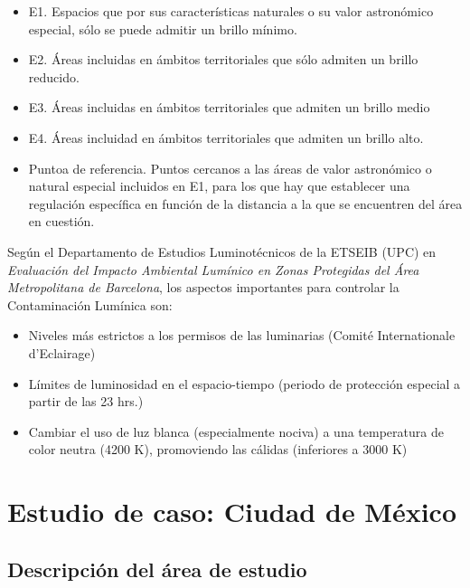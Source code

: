 \begin{itemize}

    \item E1. Espacios que por sus características naturales o su valor astronómico especial, sólo se puede admitir un brillo mínimo.
    
    \item E2. Áreas incluidas en ámbitos territoriales que sólo admiten un brillo reducido.
    
    \item E3. Áreas incluidas en ámbitos territoriales que admiten un brillo medio
    
    \item E4. Áreas incluidad en ámbitos territoriales que admiten un brillo alto.
    
    \item Puntoa de referencia. Puntos cercanos a las áreas de valor astronómico o natural especial incluidos en E1, para los que hay que establecer una regulación específica en función de la distancia a la que se encuentren del área en cuestión.
    
    
\end{itemize}

Según el Departamento de Estudios Luminotécnicos de la ETSEIB (UPC) en \textit{Evaluación del Impacto Ambiental Lumínico en Zonas Protegidas del Área Metropolitana de Barcelona}, los aspectos importantes para controlar la Contaminación Lumínica son:

\begin{itemize}
    \item Niveles más estrictos a los permisos de las luminarias (Comité Internationale d'Eclairage)
    
    \item Límites de luminosidad en el espacio-tiempo (periodo de protección especial a partir de las 23 hrs.)
    
     \item Cambiar el uso de luz blanca (especialmente nociva) a una temperatura de color neutra (4200 K), promoviendo las cálidas (inferiores a 3000 K)
     
\end{itemize}


\section{Estudio de caso: Ciudad de México}

\subsection{Descripción del área de estudio}

